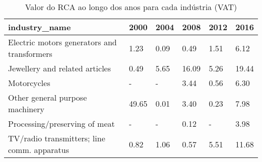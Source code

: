 \begin{table}
\centering
\caption{Valor do RCA ao longo dos anos para cada indústria (VAT)}
\begin{tabular}{p{6cm}p{1.5cm}p{1.5cm}p{1.5cm}p{1.5cm}p{1.5cm}}
\toprule
                              industry\_name &  2000 & 2004 &  2008 & 2012 &  2016 \\
\midrule
Electric motors generators and transformers &  1.23 & 0.09 &  0.49 & 1.51 &  6.12 \\
             Jewellery and related articles &  0.49 & 5.65 & 16.09 & 5.26 & 19.44 \\
                                Motorcycles &     - &    - &  3.44 & 0.56 &  6.30 \\
            Other general purpose machinery & 49.65 & 0.01 &  3.40 & 0.23 &  7.98 \\
              Processing/preserving of meat &     - &    - &  0.12 &    - &  3.98 \\
TV/radio transmitters; line comm. apparatus &  0.82 & 1.06 &  0.57 & 5.51 & 11.68 \\
\bottomrule
\end{tabular}
\end{table}
